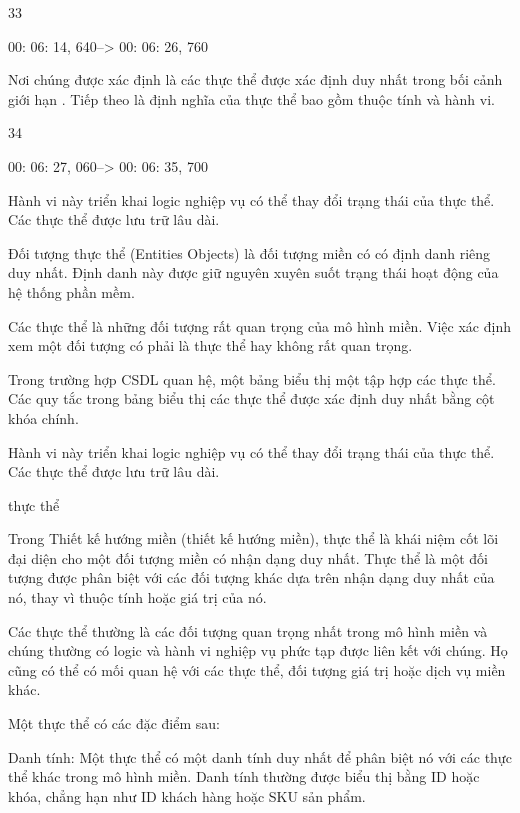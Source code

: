 33

00: 06: 14, 640--> 00: 06: 26, 760

Nơi chúng được xác định là các thực thể được xác định duy nhất trong bối cảnh giới hạn . Tiếp theo là định nghĩa của thực thể bao gồm thuộc tính và hành vi.

34

00: 06: 27, 060--> 00: 06: 35, 700

Hành vi này triển khai logic nghiệp vụ có thể thay đổi trạng thái của thực thể. Các thực thể được lưu trữ lâu dài.


Đối tượng thực thể (Entities Objects) là đối tượng miền có có định danh riêng duy nhất. Định danh này được giữ nguyên xuyên suốt trạng thái hoạt động của hệ thống phần mềm.

Các thực thể là những đối tượng rất quan trọng của mô hình miền. Việc xác định xem một đối tượng có phải là thực thể hay không rất quan trọng.

Trong trường hợp CSDL quan hệ, một bảng biểu thị một tập hợp các thực thể. Các quy tắc trong bảng biểu thị các thực thể được xác định duy nhất bằng cột khóa chính.

Hành vi này triển khai logic nghiệp vụ có thể thay đổi trạng thái của thực thể. Các thực thể được lưu trữ lâu dài.





thực thể

Trong Thiết kế hướng miền (thiết kế hướng miền), thực thể là khái niệm cốt lõi đại diện cho một đối tượng miền có nhận dạng duy nhất. Thực thể là một đối tượng được phân biệt với các đối tượng khác dựa trên nhận dạng duy nhất của nó, thay vì thuộc tính hoặc giá trị của nó.

Các thực thể thường là các đối tượng quan trọng nhất trong mô hình miền và chúng thường có logic và hành vi nghiệp vụ phức tạp được liên kết với chúng. Họ cũng có thể có mối quan hệ với các thực thể, đối tượng giá trị hoặc dịch vụ miền khác.

Một thực thể có các đặc điểm sau:

Danh tính: Một thực thể có một danh tính duy nhất để phân biệt nó với các thực thể khác trong mô hình miền. Danh tính thường được biểu thị bằng ID hoặc khóa, chẳng hạn như ID khách hàng hoặc SKU sản phẩm.

